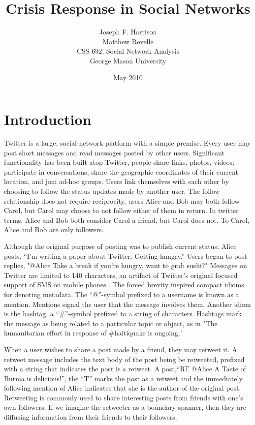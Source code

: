 \documentclass[a4paper, 11pt, titlepage]{article}
\begin{document}
\title{Crisis Response in Social Networks}
\author{Joseph F. Harrison \\
        Matthew Revelle \\
        CSS 692, Social Network Analysis \\
        George Mason University}
\date{May 2010}
\maketitle

\tableofcontents

\section{Introduction}
Twitter is a large, social-network platform with a simple premise.  Every user may post short messages and read messages posted by other users.  Significant functionality has been built atop Twitter, people share links, photos, videos; participate in conversations, share the geographic coordinates of their current location, and join ad-hoc groups.  Users link themselves with each other by choosing to follow the status updates made by another user.  The follow relationship does not require reciprocity, users Alice and Bob may both follow Carol, but Carol may choose to not follow either of them in return.  In twitter terms, Alice and Bob both consider Carol a friend, but Carol does not.  To Carol, Alice and Bob are only followers.

Although the original purpose of posting was to publish current status: Alice posts, ``I'm writing a paper about Twitter. Getting hungry.''  Users began to post replies, "@Alice Take a break if you're hungry, want to grab sushi?"  Messages on Twitter are limited to 140 characters, an artifact of Twitter's original focused support of SMS on mobile phones \cite{Sagolla2009}. The forced brevity inspired compact idioms for denoting metadata.  The ``@''-symbol prefixed to a username is known as a mention.  Mentions signal the user that the message involves them.  Another idiom is the hashtag, a ``\#''-symbol prefixed to a string of characters.  Hashtags mark the message as being related to a particular topic or object, as in "The humanitarian effort in response of \#haitiquake is ongoing."

When a user wishes to share a post made by a friend, they may retweet it.  A retweet message includes the text body of the post being be retweeted, prefixed with a string that indicates the post is a retweet.  A post,``RT @Alice A Taste of Burma is delicious!'', the ``T'' marks the post as a retweet and the immediately following mention of Alice indicates that she is the author of the original post.  Retweeting is commonly used to share interesting posts from friends with one's own followers.  If we imagine the retweeter as a boundary spanner, then they are diffusing information from their friends to their followers.
\end{document}
